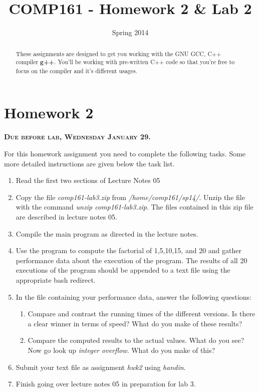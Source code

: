 \documentclass[]{tufte-handout}
\title{COMP161 - Homework 2 \& Lab 2}
\author{}
\date{Spring 2014}
\begin{document}
\maketitle

\begin{abstract}
These assignments are designed to get you working with the GNU GCC, C++ compiler \textbf{g++}.  You'll be working with pre-written C++ code so that you're free to focus on the compiler and it's different usages. 
\end{abstract}

\section{Homework 2}

\begin{center}
\textsc{\textbf{Due before lab, Wednesday January 29.}}
\end{center}

For this homework assignment you need to complete the following tasks. Some more detailed instructions are given below the task list.

\begin{enumerate}
\item Read the first two sections of Lecture Notes 05
\item Copy the file \textit{comp161-lab3.zip} from \textit{/home/comp161/sp14/}. Unzip the file with the command \textit{unzip comp161-lab3.zip}. The files contained in this zip file are described in lecture notes 05.
\item Compile the main program as directed in the lecture notes.  
\item Use the program to compute the factorial of 1,5,10,15, and 20 and gather performance data about the execution of the program. The results of all 20 executions of the program should be appended to a text file using the appropriate bash redirect.
\item In the file containing your performance data, answer the following questions:
\begin{enumerate}
\item Compare and contrast the running times of the different versions. Is there a clear winner in terms of speed? What do you make of these results?
\item Compare the computed results to the actual values. What do you see? Now go look up \textit{integer overflow}. What do you make of this?
\end{enumerate}
\item Submit your text file as assignment \textit{hwk2} using \textit{handin}.
\item Finish going over lecture notes 05 in preparation for lab 3.
\end{enumerate}
\end{document}
